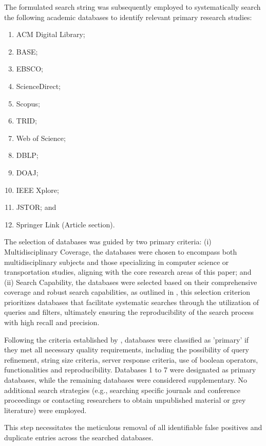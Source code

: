 The formulated search string was subsequently employed to systematically search the following academic databases to identify relevant primary research studies:
\begin{enumerate}
    \item ACM Digital Library;
    \item \acrfull{BASE};
    \item EBSCO;
    \item ScienceDirect;
    \item Scopus;
    \item \acrfull{TRID};
    \item Web of Science;
    \item \acrfull{DBLP};
    \item \acrfull{DOAJ};
    \item IEEE Xplore;
    \item JSTOR; and
    \item Springer Link (Article section).
\end{enumerate}


The selection of databases was guided by two primary criteria: (i) Multidisciplinary Coverage, the databases were chosen to encompass both multidisciplinary subjects and those specializing in computer science or transportation studies, aligning with the core research areas of this paper; and (ii)  Search Capability, the databases were selected based on their comprehensive coverage and robust search capabilities, as outlined in , this selection criterion prioritizes databases that facilitate systematic searches through the utilization of queries and filters, ultimately ensuring the reproducibility of the search process with high recall and precision.  

Following the criteria established by , databases were classified as 'primary' if they met all necessary quality requirements, including the possibility of query refinement, string size criteria, server response criteria, use of boolean operators, functionalities and reproducibility. Databases 1 to 7 were designated as primary databases, while the remaining databases were considered supplementary. No additional search strategies (e.g., searching specific journals and conference proceedings or contacting researchers to obtain unpublished material or grey literature) were employed.

This step necessitates the meticulous removal of all identifiable false positives and duplicate entries across the searched databases.

